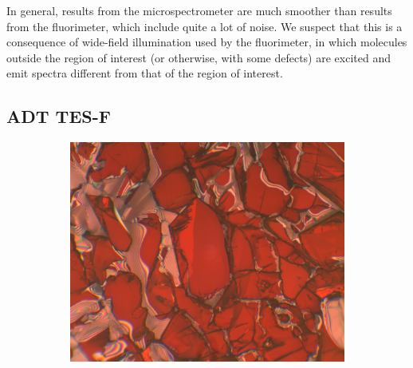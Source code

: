In general, results from the microspectrometer are much smoother than results from the fluorimeter, which include quite a lot of noise. We suspect that this is a consequence of wide-field illumination used by the fluorimeter, in which molecules outside the region of interest (or otherwise, with some defects) are excited and emit spectra different from that of the region of interest. 

\subsection{ADT TES-F}

\begin{figure}[H]
    \centering
    \begin{subfigure}[b]{0.45\textwidth}
        \includegraphics[width=\textwidth]{./img/tesf-white-illum.png}
        \caption{}
        \label{img:tesf-white}
    \end{subfigure}
    \hfill
    \begin{subfigure}[b]{0.45\textwidth}

\end{subfigure}
\end{figure}
